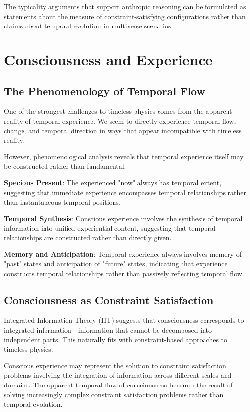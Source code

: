 \documentclass[12pt]{article}
\begin{document}
The typicality arguments that support anthropic reasoning can be formulated as statements about the measure of constraint-satisfying configurations rather than claims about temporal evolution in multiverse scenarios.

\section{Consciousness and Experience}

\subsection{The Phenomenology of Temporal Flow}

One of the strongest challenges to timeless physics comes from the apparent reality of temporal experience. We seem to directly experience temporal flow, change, and temporal direction in ways that appear incompatible with timeless reality.

However, phenomenological analysis reveals that temporal experience itself may be constructed rather than fundamental:

\textbf{Specious Present}: The experienced "now" always has temporal extent, suggesting that immediate experience encompasses temporal relationships rather than instantaneous temporal positions.

\textbf{Temporal Synthesis}: Conscious experience involves the synthesis of temporal information into unified experiential content, suggesting that temporal relationships are constructed rather than directly given.

\textbf{Memory and Anticipation}: Temporal experience always involves memory of "past" states and anticipation of "future" states, indicating that experience constructs temporal relationships rather than passively reflecting temporal flow.

\subsection{Consciousness as Constraint Satisfaction}

Integrated Information Theory (IIT) suggests that consciousness corresponds to integrated information—information that cannot be decomposed into independent parts. This naturally fits with constraint-based approaches to timeless physics.

Conscious experience may represent the solution to constraint satisfaction problems involving the integration of information across different scales and domains. The apparent temporal flow of consciousness becomes the result of solving increasingly complex constraint satisfaction problems rather than temporal evolution.
\end{document}
